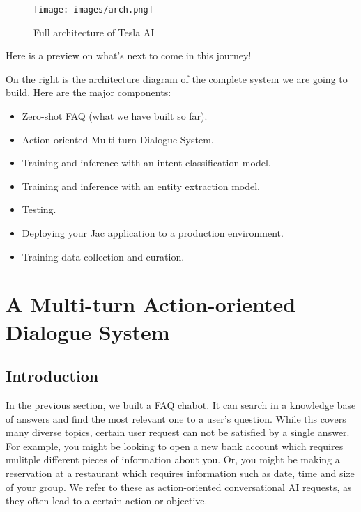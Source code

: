 \begin{figure}
\centering
\texttt{[image: images/arch.png]}
\caption{Full architecture of Tesla AI}
\end{figure}

Here is a preview on what's next to come in this journey!

On the right is the architecture diagram of the complete system we are
going to build. Here are the major components:

\begin{itemize}
\tightlist
\item
  Zero-shot FAQ (what we have built so far).
\item
  Action-oriented Multi-turn Dialogue System.
\item
  Training and inference with an intent classification model.
\item
  Training and inference with an entity extraction model.
\item
  Testing.
\item
  Deploying your Jac application to a production environment.
\item
  Training data collection and curation.
\end{itemize}

\hypertarget{a-multi-turn-action-oriented-dialogue-system}{%
\section{A Multi-turn Action-oriented Dialogue
System}\label{a-multi-turn-action-oriented-dialogue-system}}

\hypertarget{introduction}{%
\subsection{Introduction}\label{introduction}}

In the previous section, we built a FAQ chabot. It can search in a
knowledge base of answers and find the most relevant one to a user's
question. While ths covers many diverse topics, certain user request can
not be satisfied by a single answer. For example, you might be looking
to open a new bank account which requires mulitple different pieces of
information about you. Or, you might be making a reservation at a
restaurant which requires information such as date, time and size of
your group. We refer to these as action-oriented conversational AI
requests, as they often lead to a certain action or objective.

